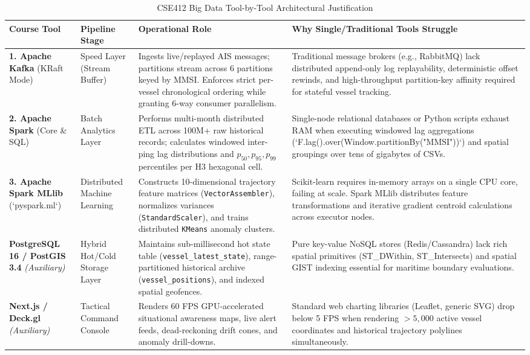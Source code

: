 \documentclass[10pt,twocolumn,a4paper]{article}
\begin{document}
\begin{table}[t]
\centering
\caption{CSE412 Big Data Tool-by-Tool Architectural Justification}
\label{tab:tools_justification}
\small
\begin{tabularx}{\textwidth}{l p{2.8cm} X X}
\toprule
\textbf{Course Tool} & \textbf{Pipeline Stage} & \textbf{Operational Role} & \textbf{Why Single/Traditional Tools Struggle} \\
\midrule
\textbf{1. Apache Kafka} (KRaft Mode) & Speed Layer (Stream Buffer) & Ingests live/replayed AIS messages; partitions stream across 6 partitions keyed by MMSI. Enforces strict per-vessel chronological ordering while granting 6-way consumer parallelism. & Traditional message brokers (e.g., RabbitMQ) lack distributed append-only log replayability, deterministic offset rewinds, and high-throughput partition-key affinity required for stateful vessel tracking. \\
\addlinespace
\textbf{2. Apache Spark} (Core \& SQL) & Batch Analytics Layer & Performs multi-month distributed ETL across 100M+ raw historical records; calculates windowed inter-ping lag distributions and $p_{50}, p_{95}, p_{99}$ percentiles per H3 hexagonal cell. & Single-node relational databases or Python scripts exhaust RAM when executing windowed lag aggregations (`F.lag().over(Window.partitionBy("MMSI"))`) and spatial groupings over tens of gigabytes of CSVs. \\
\addlinespace
\textbf{3. Apache Spark MLlib} (`pyspark.ml`) & Distributed Machine Learning & Constructs 10-dimensional trajectory feature matrices (\texttt{VectorAssembler}), normalizes variances (\texttt{StandardScaler}), and trains distributed \texttt{KMeans} anomaly clusters. & Scikit-learn requires in-memory arrays on a single CPU core, failing at scale. Spark MLlib distributes feature transformations and iterative gradient centroid calculations across executor nodes. \\
\addlinespace
\textbf{PostgreSQL 16 / PostGIS 3.4} \textit{(Auxiliary)} & Hybrid Hot/Cold Storage Layer & Maintains sub-millisecond hot state table (\texttt{vessel\_latest\_state}), range-partitioned historical archive (\texttt{vessel\_positions}), and indexed spatial geofences. & Pure key-value NoSQL stores (Redis/Cassandra) lack rich spatial primitives (ST\_DWithin, ST\_Intersects) and spatial GIST indexing essential for maritime boundary evaluations. \\
\addlinespace
\textbf{Next.js / Deck.gl} \textit{(Auxiliary)} & Tactical Command Console & Renders 60 FPS GPU-accelerated situational awareness maps, live alert feeds, dead-reckoning drift cones, and anomaly drill-downs. & Standard web charting libraries (Leaflet, generic SVG) drop below 5 FPS when rendering $>5,000$ active vessel coordinates and historical trajectory polylines simultaneously. \\
\bottomrule
\end{tabularx}
\end{table}
\end{document}
